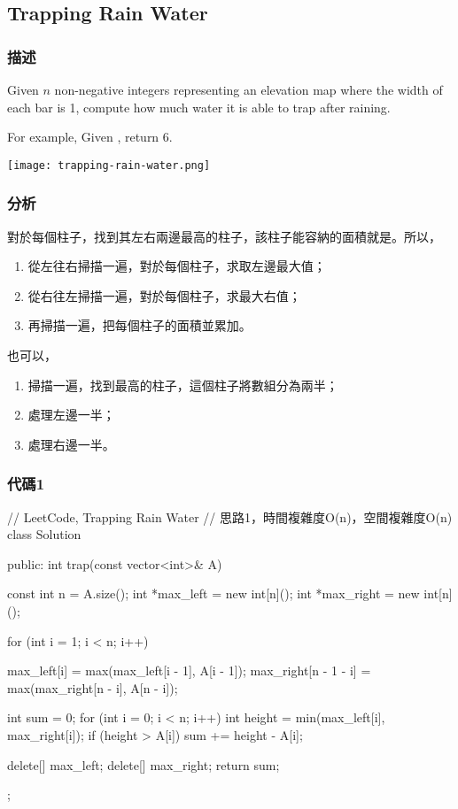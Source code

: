 \subsection{Trapping Rain Water} %
\label{sec:trapping-rain-water}


\subsubsection{描述}
Given $n$ non-negative integers representing an elevation map where the width of each bar is 1, compute how much water it is able to trap after raining.

For example,
Given \code{\[0,1,0,2,1,0,1,3,2,1,2,1\]}, return 6.

\begin{center}
\texttt{[image: trapping-rain-water.png]}\\
\label{fig:trapping-rain-water}
\end{center}


\subsubsection{分析}
對於每個柱子，找到其左右兩邊最高的柱子，該柱子能容納的面積就是。所以，
\begin{enumerate}
\item 從左往右掃描一遍，對於每個柱子，求取左邊最大值；
\item 從右往左掃描一遍，對於每個柱子，求最大右值；
\item 再掃描一遍，把每個柱子的面積並累加。
\end{enumerate}

也可以，
\begin{enumerate}
\item 掃描一遍，找到最高的柱子，這個柱子將數組分為兩半；
\item 處理左邊一半；
\item 處理右邊一半。
\end{enumerate}


\subsubsection{代碼1}
\begin{Code}
// LeetCode, Trapping Rain Water
// 思路1，時間複雜度O(n)，空間複雜度O(n)
class Solution {
public:
    int trap(const vector<int>& A) {
        const int n = A.size();
        int *max_left = new int[n]();
        int *max_right = new int[n]();

        for (int i = 1; i < n; i++) {
            max_left[i] = max(max_left[i - 1], A[i - 1]);
            max_right[n - 1 - i] = max(max_right[n - i], A[n - i]);

        }

        int sum = 0;
        for (int i = 0; i < n; i++) {
            int height = min(max_left[i], max_right[i]);
            if (height > A[i]) {
                sum += height - A[i];
            }
        }

        delete[] max_left;
        delete[] max_right;
        return sum;
    }
};
\end{Code}


